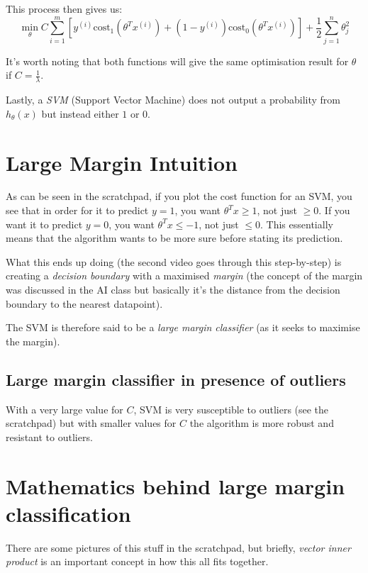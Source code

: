 This process then gives us:
\begin{equation}
\min_\theta C
\sum_{i = 1}^{m}
\left[
y^{(i)} \textrm{cost}_1(\theta^Tx^{(i)}) +
(1-y^{(i)})\textrm{cost}_0(\theta^Tx^{(i)})
\right]
+ \frac{1}{2}\sum_{j = 1}^{n}\theta_j^2
\end{equation}

It's worth noting that both functions will give the same optimisation result for $\theta$ if $C = \frac{1}{\lambda}$.

Lastly, a \emph{SVM} (Support Vector Machine) does not output a probability from $h_\theta(x)$ but instead either $1$ or $0$.

\section{Large Margin Intuition}

As can be seen in the scratchpad, if you plot the cost function for an SVM, you see that in order for it to predict $y = 1$, you want $\theta^Tx \geq 1$, not just $\geq 0$. If you want it to predict $y = 0$, you want $\theta^Tx \leq -1$, not just $\leq 0$. This essentially means that the algorithm wants to be more sure before stating its prediction.

What this ends up doing (the second video goes through this step-by-step) is creating a \emph{decision boundary} with a maximised \emph{margin} (the concept of the margin was discussed in the AI class but basically it's the distance from the decision boundary to the nearest datapoint).

The SVM is therefore said to be a \emph{large margin classifier} (as it seeks to maximise the margin).

\subsection{Large margin classifier in presence of outliers}

With a very large value for $C$, SVM is very susceptible to outliers (see the scratchpad) but with smaller values for $C$ the algorithm is more robust and resistant to outliers.

\section{Mathematics behind large margin classification}

There are some pictures of this stuff in the scratchpad, but briefly, \emph{vector inner product} is an important concept in how this all fits together.

